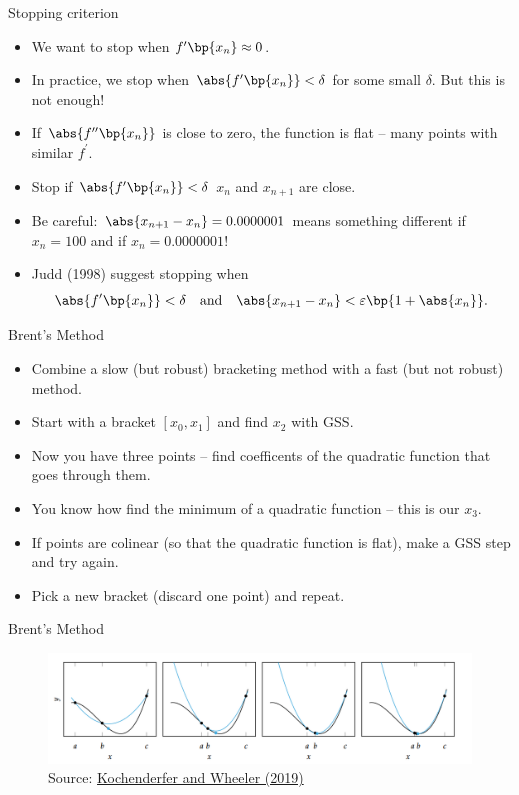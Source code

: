 \documentclass[11pt,xcolor={dvipsnames},aspectratio=159,hyperref={pdftex,pdfpagemode=UseNone,hidelinks,pdfdisplaydoctitle=true},usepdftitle=false]{beamer}
\begin{document}
    \begin{frame}{Stopping criterion}
        
        \begin{itemize}
            \item We want to stop when $f^\prime\bp{x_n} \approx 0$. 
            \item In practice, we stop when $\abs{f^\prime\bp{x_n}} < \delta$ for some small $\delta$. But this is not enough! 
            \item If $\abs{f^{\prime\prime}\bp{x_n}}$ is close to zero, the function is flat -- many points with similar $f^\prime$.
            \item Stop if  $\abs{f^\prime\bp{x_n}} < \delta$  $x_n$ and $x_{n+1}$ are close.
            \item Be careful: $\abs{x_{n+1} - x_n}=0.0000001$ means something different if $x_n=100$ and if $x_n=0.0000001$!
            \item Judd (1998) suggest stopping when 
            $$ \abs{f^\prime\bp{x_n}} < \delta \quad\text{and}\quad \abs{x_{n+1} - x_n} < \varepsilon\bp{1+ \abs{x_n}}.$$
        \end{itemize}
        \end{frame}


    \begin{frame}{Brent's Method}
        \begin{itemize}
            \item Combine a slow (but robust) bracketing method with a fast (but not robust) method.
            \item Start with a bracket $[x_0,x_1]$ and find $x_2$ with GSS.
            \item Now you have three points -- find coefficents of the quadratic function that goes through them.
            \item You know how find the minimum of a quadratic function -- this is our $x_3$.
            \item If points are colinear (so that the quadratic function is flat), make a GSS step and try again.
            \item Pick a new bracket (discard one point) and repeat.

        \end{itemize}
    \end{frame}


    \begin{frame}{Brent's Method}
        \centering
        \begin{figure}
            \includegraphics[width=1\textwidth]{quadratic.png}
            \caption{Source: \href{https://mitpress.mit.edu/9780262039420/}{Kochenderfer and Wheeler (2019)}}
        \end{figure}
        \end{frame}
\end{document}
